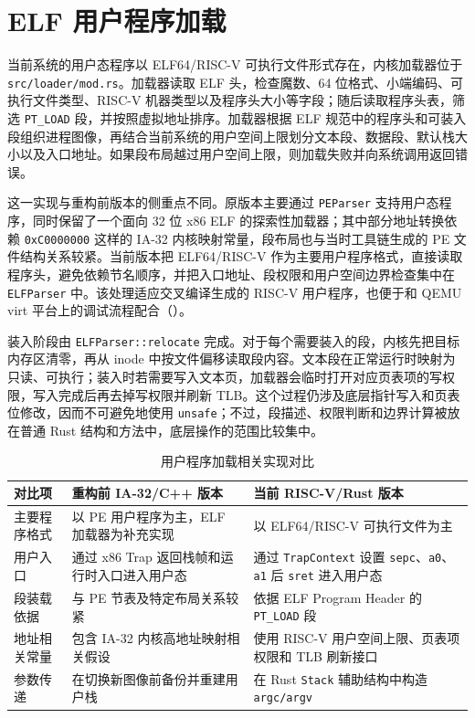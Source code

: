 \section{ELF 用户程序加载}

当前系统的用户态程序以 ELF64/RISC-V 可执行文件形式存在，内核加载器位于 \verb|src/loader/mod.rs|。加载器读取 ELF 头，检查魔数、64 位格式、小端编码、可执行文件类型、RISC-V 机器类型以及程序头大小等字段；随后读取程序头表，筛选 \verb|PT_LOAD| 段，并按照虚拟地址排序。加载器根据 ELF 规范中的程序头和可装入段组织进程图像\cite{tis_elf_1995}，再结合当前系统的用户空间上限划分文本段、数据段、默认栈大小以及入口地址。如果段布局越过用户空间上限，则加载失败并向系统调用返回错误。

这一实现与重构前版本的侧重点不同。原版本主要通过 \verb|PEParser| 支持用户态程序，同时保留了一个面向 32 位 x86 ELF 的探索性加载器；其中部分地址转换依赖 \verb|0xC0000000| 这样的 IA-32 内核映射常量，段布局也与当时工具链生成的 PE 文件结构关系较紧。当前版本把 ELF64/RISC-V 作为主要用户程序格式，直接读取程序头，避免依赖节名顺序，并把入口地址、段权限和用户空间边界检查集中在 \verb|ELFParser| 中。该处理适应交叉编译生成的 RISC-V 用户程序，也便于和 QEMU virt 平台上的调试流程配合（）。

装入阶段由 \verb|ELFParser::relocate| 完成。对于每个需要装入的段，内核先把目标内存区清零，再从 inode 中按文件偏移读取段内容。文本段在正常运行时映射为只读、可执行；装入时若需要写入文本页，加载器会临时打开对应页表项的写权限，写入完成后再去掉写权限并刷新 TLB。这个过程仍涉及底层指针写入和页表位修改，因而不可避免地使用 \verb|unsafe|；不过，段描述、权限判断和边界计算被放在普通 Rust 结构和方法中，底层操作的范围比较集中。

\begin{table}[htbp]
  \centering
  \caption{用户程序加载相关实现对比}\label{tab:loader-before-after}
  \renewcommand{\arraystretch}{1.25}
  \begin{tabular}{p{}p{}p{}}
    \toprule
    对比项 & 重构前 IA-32/C++ 版本 & 当前 RISC-V/Rust 版本 \\
    \midrule
    主要程序格式 & 以 PE 用户程序为主，ELF 加载器为补充实现 & 以 ELF64/RISC-V 可执行文件为主 \\
    用户入口 & 通过 x86 Trap 返回栈帧和运行时入口进入用户态 & 通过 \verb|TrapContext| 设置 \verb|sepc|、\verb|a0|、\verb|a1| 后 \verb|sret| 进入用户态 \\
    段装载依据 & 与 PE 节表及特定布局关系较紧 & 依据 ELF Program Header 的 \verb|PT_LOAD| 段 \\
    地址相关常量 & 包含 IA-32 内核高地址映射相关假设 & 使用 RISC-V 用户空间上限、页表项权限和 TLB 刷新接口 \\
    参数传递 & 在切换新图像前备份并重建用户栈 & 在 Rust \verb|Stack| 辅助结构中构造 \verb|argc/argv| \\
    \bottomrule
  \end{tabular}
\end{table}

